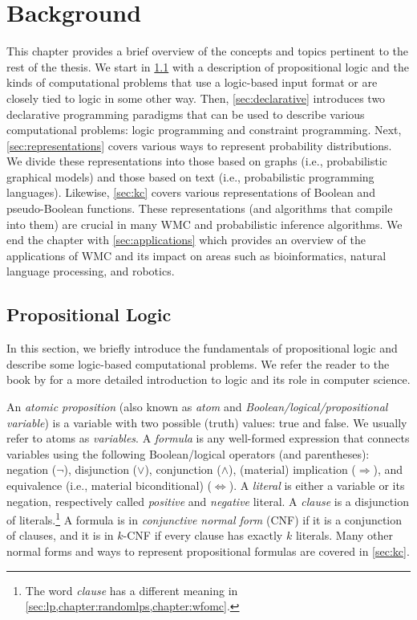 \chapter{Background} \label{chapter:background}


This chapter provides a brief overview of the concepts and topics pertinent to the rest of the thesis. We start in \cref{sec:proplogic} with a description of propositional logic and the kinds of computational problems that use a logic-based input format or are closely tied to logic in some other way. Then, \cref{sec:declarative} introduces two declarative programming paradigms that can be used to describe various computational problems: logic programming and constraint programming. Next, \cref{sec:representations} covers various ways to represent probability distributions. We divide these representations into those based on graphs (i.e., probabilistic graphical models) and those based on text (i.e., probabilistic programming languages). Likewise, \cref{sec:kc} covers various representations of Boolean and pseudo-Boolean functions. These representations (and algorithms that compile into them) are crucial in many WMC and probabilistic inference algorithms. We end the chapter with \cref{sec:applications} which provides an overview of the applications of WMC and its impact on areas such as bioinformatics, natural language processing, and robotics.

\section{Propositional Logic} \label{sec:proplogic}

In this section, we briefly introduce the fundamentals of propositional logic and describe some logic-based computational problems. We refer the reader to the book by \citet{DBLP:books/daglib/0029942} for a more detailed introduction to logic and its role in computer science.

An \emph{atomic proposition} (also known as \emph{atom} and \emph{Boolean/logical/propositional variable}) is a variable with two possible (truth) values: true and false. We usually refer to atoms as \emph{variables}. A \emph{formula} is any well-formed expression that connects variables using the following Boolean/logical operators (and parentheses): negation ($\neg$), disjunction ($\lor$), conjunction ($\land$), (material) implication ($\Rightarrow$), and equivalence (i.e., material biconditional) ($\Leftrightarrow$). A \emph{literal} is either a variable or its negation, respectively called \emph{positive} and \emph{negative} literal. A \emph{clause} is a disjunction of literals.\footnote{The word \emph{clause} has a different meaning in \cref{sec:lp,chapter:randomlps,chapter:wfomc}.} A formula is in \emph{conjunctive normal form} (CNF) if it is a conjunction of clauses, and it is in $k$-CNF if every clause has exactly $k$ literals. Many other normal forms and ways to represent propositional formulas are covered in \cref{sec:kc}.

